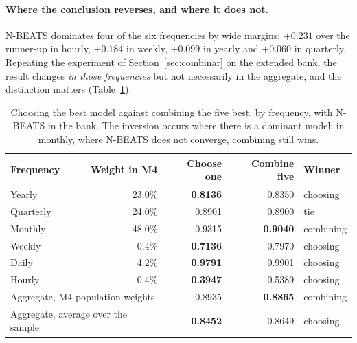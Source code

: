 \paragraph{Where the conclusion reverses, and where it does not.} N-BEATS dominates four
of the six frequencies by wide margins: $+0.231$ over the runner-up in hourly, $+0.184$ in
weekly, $+0.099$ in yearly and $+0.060$ in quarterly. Repeating the experiment of
Section~\ref{sec:combinar} on the extended bank, the result changes \emph{in those
frequencies} but not necessarily in the aggregate, and the distinction matters
(Table~\ref{tab:inversion}).

\begin{table}[htbp]
\centering
\caption{Choosing the best model against combining the five best, by frequency, with
N-BEATS in the bank. The inversion occurs where there is a dominant model; in monthly,
where N-BEATS does not converge, combining still wins.}
\label{tab:inversion}
\begin{tabular}{lrrrl}
\toprule
\textbf{Frequency} & \textbf{Weight in M4} & \textbf{Choose one} &
\textbf{Combine five} & \textbf{Winner} \\
\midrule
Yearly    & 23.0\% & \textbf{0.8136} & 0.8350 & choosing \\
Quarterly & 24.0\% & 0.8901 & 0.8900 & tie \\
Monthly   & 48.0\% & 0.9315 & \textbf{0.9040} & combining \\
Weekly    &  0.4\% & \textbf{0.7136} & 0.7970 & choosing \\
Daily     &  4.2\% & \textbf{0.9791} & 0.9901 & choosing \\
Hourly    &  0.4\% & \textbf{0.3947} & 0.5389 & choosing \\
\midrule
\multicolumn{2}{l}{Aggregate, M4 population weights} & 0.8935 & \textbf{0.8865} & combining \\
\multicolumn{2}{l}{Aggregate, average over the sample} & \textbf{0.8452} & 0.8649 & choosing \\
\bottomrule
\end{tabular}
\end{table}

